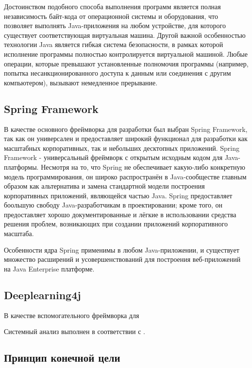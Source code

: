 Достоинством подобного способа выполнения программ является полная независимость байт-кода от операционной системы и оборудования, что позволяет выполнять Java-приложения на любом устройстве, для которого существует соответствующая виртуальная машина.
Другой важной особенностью технологии Java является гибкая система безопасности, в рамках которой исполнение программы полностью контролируется виртуальной машиной.
Любые операции, которые превышают установленные полномочия программы (например, попытка несанкционированного доступа к данным или соединения с другим компьютером), вызывают немедленное прерывание.

\subsection{Spring Framework}

В качестве основного фреймворка для разработки был выбран Spring Framework, так как он универсален и предоставляет широкий функционал для разработки как масштабных корпоративных, так и небольших десктопных приложений.
Spring Framework - универсальный фреймворк с открытым исходным кодом для Java-платформы.
Несмотря на то, что Spring не обеспечивает какую-либо конкретную модель программирования, он широко распространён в Java-сообществе главным образом как альтернатива и замена стандартной модели построения корпоративных приложений, являющейся частью Java.
Spring предоставляет боольшую свободу Java-разработчикам в проектировании; кроме того, он предоставляет хорошо документированные и лёгкие в использовании средства решения проблем, возникающих при создании приложений корпоративного масштаба.

Особенности ядра Spring применимы в любом Java-приложении, и существует множество расширений и усовершенствований для построения веб-приложений на Java Enterprise платформе.

\subsection{Deeplearning4j}

В качестве вспомогательного фреймворка для 

Системный анализ выполнен в соответствии с \cite{sys-analyz}.

\subsection{Принцип конечной цели} \label{goal}

